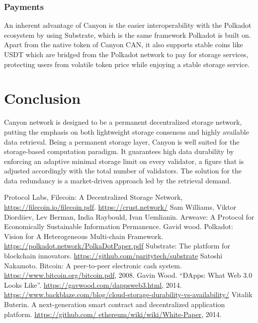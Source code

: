 \documentclass[]{article}
\begin{document}
\subsubsection{Payments}

An inherent advantage of Canyon is the easier interoperability with the Polkadot\cite{polkadot} ecosystem by using Substrate\cite{substrate}, which is the same framework Polkadot is built on. Apart from the native token of Canyon CAN, it also supports stable coins like USDT which are bridged from the Polkadot network to pay for storage services, protecting users from volatile token price while enjoying a stable storage service.

\section{Conclusion}

Canyon network is designed to be a permanent decentralized storage network, putting the emphasis on both lightweight storage consensus and highly available data retrieval. Being a permanent storage layer, Canyon is well suited for the storage-based computation paradigm. It guarantees high data durability by enforcing an adaptive minimal storage limit on every validator, a figure that is adjusted accordingly with the total number of validators. The solution for the data redundancy is a market-driven approach led by the retrieval demand.

\begin{thebibliography}{99}
Protocol Labs, Filecoin: A Decentralized Storage Network, \url{https://filecoin.io/filecoin.pdf}.
\url{https://crust.network/}
Sam Williams, Viktor Diordiiev, Lev Berman, India Raybould, Ivan Uemlianin. Arweave: A Protocol for Economically Sustainable Information Permanence.
Gavid wood. Polkadot: Vision for A Heterogeneous Multi-chain Framework. \url{https://polkadot.network/PolkaDotPaper.pdf}
Substrate: The platform for blockchain innovators. \url{https://github.com/paritytech/substrate}
Satoshi Nakamoto. Bitcoin: A peer-to-peer electronic cash system. \url{https://www.bitcoin.org/bitcoin.pdf}, 2008.
Gavin Wood. “ĐApps: What Web 3.0 Looks Like”. \url{https://gavwood.com/dappsweb3.html}, 2014.
\url{https://www.backblaze.com/blog/cloud-storage-durability-vs-availability/}
Vitalik Buterin. A next-generation smart contract and decentralized application platform. \url{https://github.com/
ethereum/wiki/wiki/White-Paper}, 2014.
\end{thebibliography}
\end{document}
